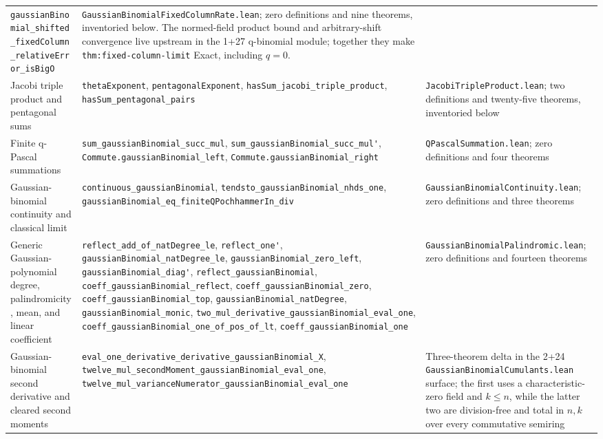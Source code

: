 \documentclass[11pt,oneside]{article}
\theoremstyle{definition}
\theoremstyle{remark}
\begin{document}
\begin{longtable}{@{}p{}p{}p{}@{}}
\nolinkurl{gaussianBinomial_shifted_fixedColumn_relativeError_isBigO} &
\nolinkurl{GaussianBinomialFixedColumnRate.lean}; zero definitions and nine
theorems, inventoried below. The normed-field product bound and
arbitrary-shift convergence live upstream in the 1+27 q-binomial module;
together they make \nolinkurl{thm:fixed-column-limit} Exact, including \(q=0\). \\
Jacobi triple product and pentagonal sums &
\nolinkurl{thetaExponent}, \nolinkurl{pentagonalExponent},
\nolinkurl{hasSum_jacobi_triple_product}, \nolinkurl{hasSum_pentagonal_pairs} &
\nolinkurl{JacobiTripleProduct.lean}; two definitions and twenty-five
theorems, inventoried below \\
Finite q-Pascal summations &
\nolinkurl{sum_gaussianBinomial_succ_mul},
\nolinkurl{sum_gaussianBinomial_succ_mul'},
\nolinkurl{Commute.gaussianBinomial_left},
\nolinkurl{Commute.gaussianBinomial_right} &
\nolinkurl{QPascalSummation.lean}; zero definitions and four theorems \\
Gaussian-binomial continuity and classical limit &
\nolinkurl{continuous_gaussianBinomial},
\nolinkurl{tendsto_gaussianBinomial_nhds_one},
\nolinkurl{gaussianBinomial_eq_finiteQPochhammerIn_div} &
\nolinkurl{GaussianBinomialContinuity.lean}; zero definitions and three theorems \\
Generic Gaussian-polynomial degree, palindromicity, mean, and linear coefficient &
\nolinkurl{reflect_add_of_natDegree_le}, \nolinkurl{reflect_one'},
\nolinkurl{gaussianBinomial_natDegree_le},
\nolinkurl{gaussianBinomial_zero_left}, \nolinkurl{gaussianBinomial_diag'},
\nolinkurl{reflect_gaussianBinomial},
\nolinkurl{coeff_gaussianBinomial_reflect},
\nolinkurl{coeff_gaussianBinomial_zero},
\nolinkurl{coeff_gaussianBinomial_top},
\nolinkurl{gaussianBinomial_natDegree}, \nolinkurl{gaussianBinomial_monic},
\nolinkurl{two_mul_derivative_gaussianBinomial_eval_one},
\nolinkurl{coeff_gaussianBinomial_one_of_pos_of_lt},
\nolinkurl{coeff_gaussianBinomial_one} &
\nolinkurl{GaussianBinomialPalindromic.lean}; zero definitions and fourteen theorems \\
Gaussian-binomial second derivative and cleared second moments &
\nolinkurl{eval_one_derivative_derivative_gaussianBinomial_X},
\nolinkurl{twelve_mul_secondMoment_gaussianBinomial_eval_one},
\nolinkurl{twelve_mul_varianceNumerator_gaussianBinomial_eval_one} &
Three-theorem delta in the 2+24
\nolinkurl{GaussianBinomialCumulants.lean} surface; the first uses a
characteristic-zero field and \(k\le n\), while the latter two are
division-free and total in \(n,k\) over every commutative semiring \\

\end{longtable}
\end{document}
